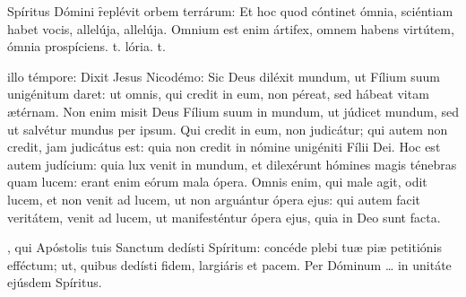 \documentclass[fontsize=9pt,paper=A6,twoside,BCOR=1mm,DIV=22,headinclude]{scrarticle}
\begin{document}
\begin{multicols}{2}
\R Spíritus Dómini \f replévit orbem terrárum:
\red{*} Et hoc quod cóntinet ómnia, sciéntiam habet vocis, allelúja, allelúja.
\V Omnium est enim ártifex, omnem habens virtútem, ómnia prospíciens.
t.
lória.
t.

 illo témpore: Dixit Jesus Nicodémo: Sic Deus diléxit mundum, ut Fílium suum unigénitum daret: ut omnis, qui credit in eum, non péreat, sed hábeat vitam ætérnam. Non enim misit Deus Fílium suum in mundum, ut júdicet mundum, sed ut salvétur mundus per ipsum. Qui credit in eum, non judicátur; qui autem non credit, jam judicátus est: quia non credit in nómine unigéniti Fílii Dei. Hoc est autem judícium: quia lux venit in mundum, et dilexérunt hómines magis ténebras quam lucem: erant enim eórum mala ópera. Omnis enim, qui male agit, odit lucem, et non venit ad lucem, ut non arguántur ópera ejus: qui autem facit veritátem, venit ad lucem, ut manifesténtur ópera ejus, quia in Deo sunt facta.

, qui Apóstolis tuis Sanctum dedísti Spíritum: concéde plebi tuæ piæ petitiónis efféctum; ut, quibus dedísti fidem, largiáris et pacem. Per Dóminum … in unitáte ejúsdem Spíritus.
\ornamentviii


\end{multicols}

\ornamentvi
\end{document}
